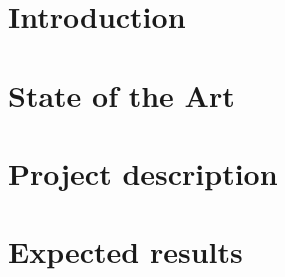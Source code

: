 \documentclass[12pt]{article}
\begin{document}
\section{Introduction}\label{sec:introduction}

\section{State of the Art}\label{sec:state-of-the-art}

\section{Project description}\label{sec:project-description}

\section{Expected results}\label{sec:expected-results}
\end{document}
